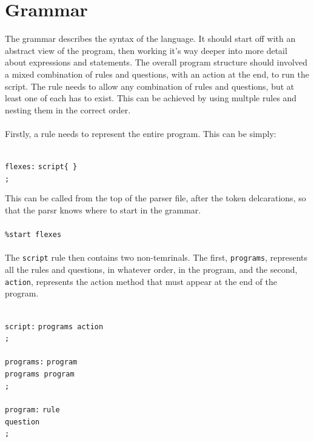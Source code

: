 \documentclass[12pt]{report}
\begin{document}
\section{Grammar}\label{sec:grammar}
The grammar describes the syntax of the language.  It should start off with an abstract view of the program, then working it's way deeper into more detail about expressions and statements.  The overall program structure should involved a mixed combination of rules and questions, with an action at the end, to run the script.  The rule needs to allow any combination of rules and questions, but at least one of each has to exist.  This can be achieved by using multple rules and nesting them in the correct order.\\
\\
Firstly, a rule needs to represent the entire program.  This can be simply:\\
\\
\begin{tabbing}
	\texttt{flexes:} \= \texttt{script\quad\quad\{ \}}\\
	\> \texttt{;}\\
\end{tabbing}
This can be called from the top of the parser file, after the token delcarations, so that the parsr knows where to start in the grammar.\\
\\
\texttt{\%start flexes}\\
\\
The \texttt{script} rule then contains two non-temrinals.  The first, \texttt{programs}, represents all the rules and questions, in whatever order, in the program, and the second, \texttt{action}, represents the action method that must appear at the end of the program.\\
\\
\begin{tabbing}
	\texttt{script:} \= \texttt{programs action}\\
	\> \texttt{;}\\
	\\
	\texttt{programs:} \= \texttt{program}\\
	\> \texttt{\textbar \space programs program}\\
	\> \texttt{;}\\
	\\
	\texttt{program:} \= \texttt{rule}\\
	\> \texttt{\textbar \space question}\\
	\> \texttt{;}\\
\end{tabbing}
\end{document}
